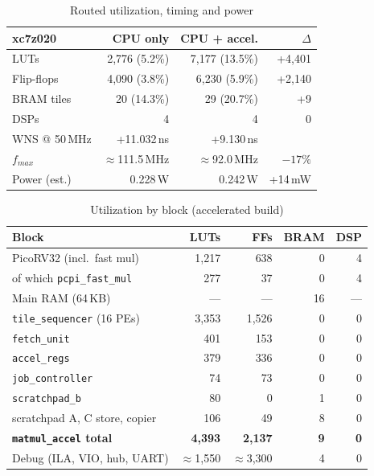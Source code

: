 \documentclass[10pt,twocolumn,a4paper]{article}
\begin{document}
\begin{table}[t]
\caption{Routed utilization, timing and power}\label{tab:util}
\centering\footnotesize
\begin{tabular}{lrrr}
\toprule
xc7z020 & CPU only & CPU + accel. & $\Delta$ \\
\midrule
LUTs & 2,776 (5.2\%) & 7,177 (13.5\%) & +4,401 \\
Flip-flops & 4,090 (3.8\%) & 6,230 (5.9\%) & +2,140 \\
BRAM tiles & 20 (14.3\%) & 29 (20.7\%) & +9 \\
DSPs & 4 & 4 & 0 \\
WNS @ 50\,MHz & +11.032\,ns & +9.130\,ns & \\
$f_{max}$ & $\approx$111.5\,MHz & $\approx$92.0\,MHz & $-17\%$ \\
Power (est.) & 0.228\,W & 0.242\,W & +14\,mW \\
\bottomrule
\end{tabular}
\end{table}

\begin{table}[t]
\caption{Utilization by block (accelerated build)}\label{tab:blocks}
\centering\footnotesize
\begin{tabular}{lrrrr}
\toprule
Block & LUTs & FFs & BRAM & DSP \\
\midrule
PicoRV32 (incl.\ fast mul) & 1,217 & 638 & 0 & 4 \\
\quad of which \texttt{pcpi\_fast\_mul} & 277 & 37 & 0 & 4 \\
Main RAM (64\,KB) & --- & --- & 16 & --- \\
\midrule
\texttt{tile\_sequencer} (16 PEs) & 3,353 & 1,526 & 0 & 0 \\
\texttt{fetch\_unit} & 401 & 153 & 0 & 0 \\
\texttt{accel\_regs} & 379 & 336 & 0 & 0 \\
\texttt{job\_controller} & 74 & 73 & 0 & 0 \\
\texttt{scratchpad\_b} & 80 & 0 & 1 & 0 \\
scratchpad A, C store, copier & 106 & 49 & 8 & 0 \\
\textbf{\texttt{matmul\_accel} total} & \textbf{4,393} & \textbf{2,137} & \textbf{9} & \textbf{0} \\
\midrule
Debug (ILA, VIO, hub, UART) & $\approx$1,550 & $\approx$3,300 & 4 & 0 \\
\bottomrule
\end{tabular}
\end{table}
\end{document}
